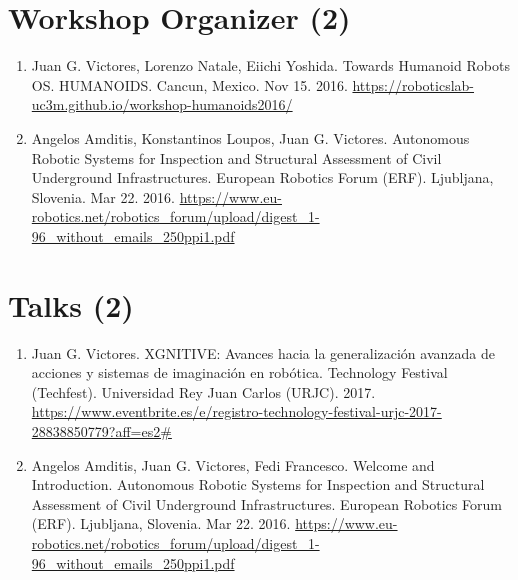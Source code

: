 \documentclass{article}
\begin{document}
\section*{Workshop Organizer (2)}
\begin{enumerate}
\item Juan G. Victores, Lorenzo Natale, Eiichi Yoshida. Towards Humanoid Robots OS. HUMANOIDS. Cancun, Mexico. Nov 15. 2016. \url{https://roboticslab-uc3m.github.io/workshop-humanoids2016/}
\item Angelos Amditis, Konstantinos Loupos, Juan G. Victores. Autonomous Robotic Systems for Inspection and Structural Assessment of Civil Underground Infrastructures. European Robotics Forum (ERF). Ljubljana, Slovenia. Mar 22. 2016. \url{https://www.eu-robotics.net/robotics\_forum/upload/digest\_1-96\_without\_emails\_250ppi1.pdf}
\end{enumerate}

\section*{Talks (2)}
\begin{enumerate}
\item Juan G. Victores. XGNITIVE: Avances hacia la generalización avanzada de acciones y sistemas de imaginación en robótica. Technology Festival (Techfest). Universidad Rey Juan Carlos (URJC). 2017. \url{https://www.eventbrite.es/e/registro-technology-festival-urjc-2017-28838850779?aff=es2#}
\item Angelos Amditis, Juan G. Victores, Fedi Francesco. Welcome and Introduction. Autonomous Robotic Systems for Inspection and Structural Assessment of Civil Underground Infrastructures. European Robotics Forum (ERF). Ljubljana, Slovenia. Mar 22. 2016. \url{https://www.eu-robotics.net/robotics\_forum/upload/digest\_1-96\_without\_emails\_250ppi1.pdf}
\end{enumerate}
\end{document}
